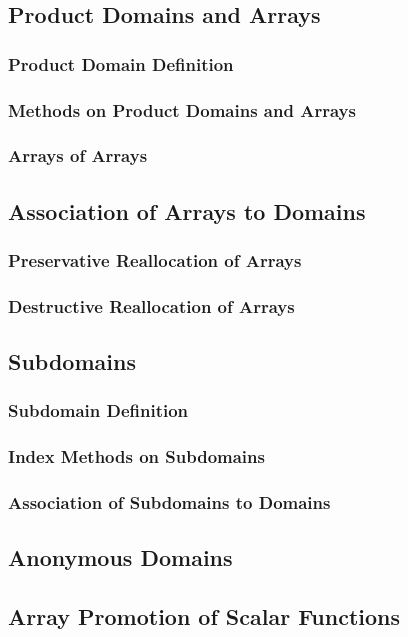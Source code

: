 \documentclass[10pt,twoside,titlepage]{article}
\begin{document}
\subsection{Product Domains and Arrays}
\subsubsection{Product Domain Definition}
\subsubsection{Methods on Product Domains and Arrays}
\subsubsection{Arrays of Arrays}
\subsection{Association of Arrays to Domains}
\subsubsection{Preservative Reallocation of Arrays}
\subsubsection{Destructive Reallocation of Arrays}
\subsection{Subdomains}
\subsubsection{Subdomain Definition}
\subsubsection{Index Methods on Subdomains}
\subsubsection{Association of Subdomains to Domains}
\subsection{Anonymous Domains}
\subsection{Array Promotion of Scalar Functions}
\end{document}
